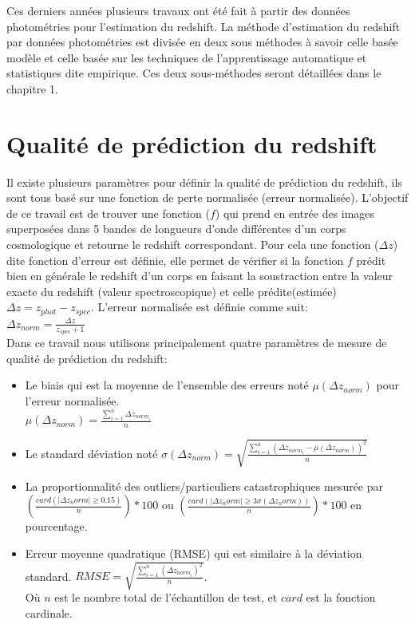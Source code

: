 Ces derniers années plusieurs  travaux \cite{Gabriel, meuphirim, isanto, photoSED, stack} ont été fait à partir des données photométries pour l'estimation du redshift. La méthode d'estimation du redshift par données photométries est divisée en deux sous méthodes à savoir celle basée modèle et celle basée sur les techniques de l'apprentissage automatique et statistiques dite empirique. Ces deux sous-méthodes seront détaillées dans le chapitre 1.

\section*{Qualité de prédiction du redshift}
Il existe plusieurs paramètres pour définir la qualité de prédiction du redshift, ils sont tous basé sur une fonction de perte normalisée (erreur normalisée). L'objectif de ce travail est de trouver une fonction ($f$) qui prend en entrée des images superposées dans 5 bandes de longueurs d'onde différentes d'un corps cosmologique et retourne le redshift correspondant. Pour cela une fonction ($\Delta z$) dite fonction d'erreur est définie, elle permet de vérifier si la fonction $f$ prédit bien en générale le redshift d'un corps en faisant la soustraction entre la valeur exacte du redshift (valeur spectroscopique) et celle prédite(estimée) $\Delta z = z_{phot} - z_{spec}$. L'erreur normalisée est définie comme suit: \\
$\Delta z_{norm} = \frac{\Delta z}{z_{spec} + 1}$ \\
Dans ce travail nous utilisons principalement quatre paramètres de mesure de qualité de prédiction du redshift: \\
\begin{itemize}
	\item Le biais qui est la moyenne de l'ensemble des erreurs noté %
	 $\mu(\Delta z_{norm})$ pour l'erreur normalisée. \\ %
	 $\mu(\Delta z_{norm}) = \frac{\sum_{i=1}^{n} \Delta z_{norm_i}}{n}$
	\item Le standard déviation noté $\sigma (\Delta z_{norm}) = \sqrt{\frac{\sum_{i = 1}^{n} (\Delta z_{norm_i} - \mu(\Delta z_{norm}) )^2}{n}}$ 
	\item La proportionnalité des outliers/particuliers catastrophiques mesurée par $(\frac{card(|\Delta z_norm| \geq 0.15)}{n})*100$ ou $(\frac{card(|\Delta z_norm| \geq 3\sigma(\Delta z_norm))}{n})*100$ en pourcentage. 
	\item  Erreur moyenne quadratique (RMSE) qui est similaire à la déviation standard.
	$RMSE = \sqrt{\frac{\sum_{i=1}^{n} (\Delta z_{norm_i})^2}{n}}$. \\
	Où $n$ est le nombre total de l'échantillon de test, et $card$ est la fonction cardinale.
	
\end{itemize}
